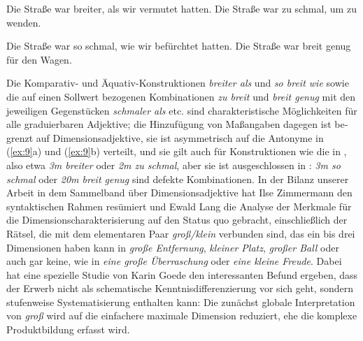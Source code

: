 \documentclass[output=paper,colorlinks,citecolor=brown]{langscibook}
\begin{document}
\begin{otherlanguage}{german}
\ea
\ea Die Straße war breiter, als wir vermutet hatten. \label{ex:16a}
\ex Die Straße war zu schmal, um zu wenden. \label{ex:16b}
\z
\label{ex:16}
\z 

\ea
\ea Die Straße war so schmal, wie wir befürchtet hatten. \label{ex:17a}
\ex Die Straße war breit genug für den Wagen. \label{ex:17b}
\z
\label{ex:17}
\z

\noindent Die Komparativ- und Äquativ-Konstruktionen \textit{breiter als} und \textit{so breit wie} sowie die auf einen Sollwert bezogenen Kombinationen \textit{zu breit} und \textit{breit genug} mit den jeweiligen Gegenstücken \textit{schmaler als} etc. sind charakteristische Möglichkeiten für alle graduierbaren Adjektive; die Hinzufügung von Maßangaben dagegen ist begrenzt auf Dimensionsadjektive, sie ist asymmetrisch auf die Antonyme in (\ref{ex:9}a) und (\ref{ex:9}b) verteilt, und sie gilt auch für Konstruktionen wie die in , also etwa \textit{3m breiter} oder \textit{2m zu schmal}, aber sie ist ausgeschlossen in : \textit{3m so schmal} oder \textit{20m breit genug} sind defekte Kombinationen. In der Bilanz unserer Arbeit in dem Sammelband über Dimensionsadjektive \citep{BierwischLang1987} hat Ilse Zimmermann den syntaktischen Rahmen resümiert und Ewald Lang die Analyse der Merkmale für die Dimensionscharakterisierung auf den Status quo gebracht, einschließlich der Rätsel, die mit dem elementaren Paar \textit{groß/klein} verbunden sind, das ein bis drei Dimensionen haben kann in \textit{große Entfernung}, \textit{kleiner Platz}, \textit{großer Ball} oder auch gar keine, wie in \textit{eine große Überraschung} oder \textit{eine kleine Freude}. Dabei hat eine spezielle Studie von Karin Goede \citep{Goede1987} den interessanten Befund ergeben, dass der Erwerb nicht als schematische Kenntnisdifferenzierung vor sich geht, sondern stufenweise Systematisierung enthalten kann: Die zunächst globale Interpretation von \textit{groß} wird auf die einfachere maximale Dimension reduziert, ehe die komplexe Produktbildung erfasst wird.


\end{otherlanguage}
\end{document}
